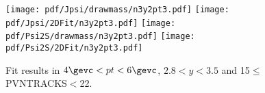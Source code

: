 \begin{figure}[H]
\begin{center}
\texttt{[image: pdf/Jpsi/drawmass/n3y2pt3.pdf]}
\texttt{[image: pdf/Jpsi/2DFit/n3y2pt3.pdf]}
\vspace*{-0.5cm}
\texttt{[image: pdf/Psi2S/drawmass/n3y2pt3.pdf]}
\texttt{[image: pdf/Psi2S/2DFit/n3y2pt3.pdf]}
\vspace*{-0.5cm}
\end{center}
\caption{Fit results in $4\gevc<pt<6\gevc$, $2.8<y<3.5$ and 15$\leq$PVNTRACKS$<$22.}
\label{Fitn3y2pt3}
\end{figure}
